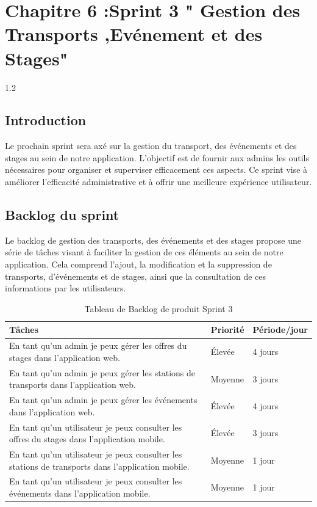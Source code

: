 \chapter{ Chapitre 6 :Sprint 3 " Gestion des  \centering Transports ,Evénement et des Stages"}
\begin{spacing}{1.2}
\minitoc
\thispagestyle{MyStyle}
\end{spacing}
\newpage
\begin{sloppypar} 

\section{Introduction }
\vspace{-4mm}
Le prochain sprint sera axé sur la gestion du transport, des événements et des stages au sein de notre application. L'objectif est de fournir aux admins les outils nécessaires pour organiser et superviser efficacement ces aspects. Ce sprint vise à améliorer l'efficacité administrative et à offrir une meilleure expérience utilisateur.

\vspace{-9mm}
\section{Backlog du sprint}
\vspace{-4mm}
Le backlog de gestion des transports, des événements et des stages propose une série de tâches visant à faciliter la gestion de ces éléments au sein de notre application. Cela comprend l'ajout, la modification et la suppression de transports, d'événements et de stages, ainsi que la consultation de ces informations par les utilisateurs.
\vspace{-3mm}
\begin{table}[h]
\centering
\begin{tabular}{|p{10cm}|p{2cm}|p{2.5cm}|}
\hline
\textbf{ Tâches } & \textbf{ Priorité }& \textbf{Période/jour}  \\
\hline
En tant qu’un admin je peux gérer les offres du stages dans l’application web. & Élevée  & 4 jours  \\
\hline
En tant qu’un admin je peux gérer les stations de transports dans l’application web. & Moyenne  & 3 jours  \\
\hline
En tant qu’un admin je peux gérer les événements dans l’application web. & Élevée & 4 jours \\
\hline
En tant qu’un utilisateur je peux consulter  les offres du stages dans l’application mobile. & Élevée  & 3 jours \\
\hline
En tant qu’un utilisateur je peux consulter  les stations de transports dans l’application mobile. & Moyenne & 1 jour\\
\hline
En tant qu’un utilisateur je peux consulter  les événements dans l’application mobile. & Moyenne & 1 jour\\
\hline
\end{tabular}
\caption{Tableau de Backlog de produit Sprint 3}
\end{table}
\vspace{-1.2cm}

\end{sloppypar}
